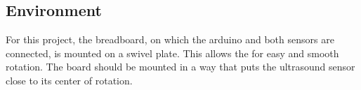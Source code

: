 \subsection{Environment}
\label{subsec:environment}

For this project, the breadboard, on which the arduino and both sensors are connected, is mounted on a swivel plate.
This allows the for easy and smooth rotation.
The board should be mounted in a way that puts the ultrasound sensor close to its center of rotation.